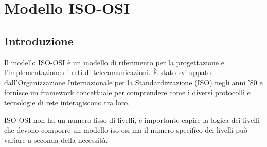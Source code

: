 \section{Modello ISO-OSI}
\subsection{Introduzione}
Il modello ISO-OSI è un modello di riferimento per la progettazione e l'implementazione di reti di telecomunicazioni. È stato sviluppato dall'Organizzazione Internazionale per la Standardizzazione (ISO) negli anni '80 e fornisce un framework concettuale per comprendere come i diversi protocolli e tecnologie di rete interagiscono tra loro.

ISO OSI non ha un numero fisso di livelli, è importante capire la logica dei livelli che devono comporre un modello iso osi ma il numero specifico dei livelli può variare a seconda della necessità.

